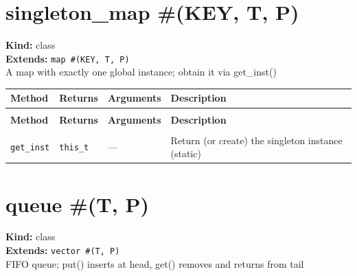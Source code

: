 \documentclass[11pt,letterpaper]{report}
\begin{document}
\section{singleton\_map \#(KEY, T, P)}
\label{cls:singletonmapKEYTP}

\noindent\textbf{Kind:} class\\
\noindent\textbf{Extends:} \texttt{map \#(KEY, T, P)}\\
\noindent A map with exactly one global instance; obtain it via get\_inst()

\begin{xltabular}{\linewidth}{>{\small}p{1.35in} >{\small}p{1.25in} >{\small}p{0.95in} >{\small}X}
\toprule
\textbf{Method} & \textbf{Returns} & \textbf{Arguments} & \textbf{Description} \\
\midrule
\endfirsthead
{} \\
\midrule
\textbf{Method} & \textbf{Returns} & \textbf{Arguments} & \textbf{Description} \\
\midrule
\endhead
\midrule
{} \\
\endfoot
\bottomrule
\endlastfoot
\texttt{get\_inst} & \texttt{this\_t} & --- & Return (or create) the singleton instance (static) \\
\end{xltabular}

\section{queue \#(T, P)}
\label{cls:queueTP}

\noindent\textbf{Kind:} class\\
\noindent\textbf{Extends:} \texttt{vector \#(T, P)}\\
\noindent FIFO queue; put() inserts at head, get() removes and returns from tail
\end{document}
